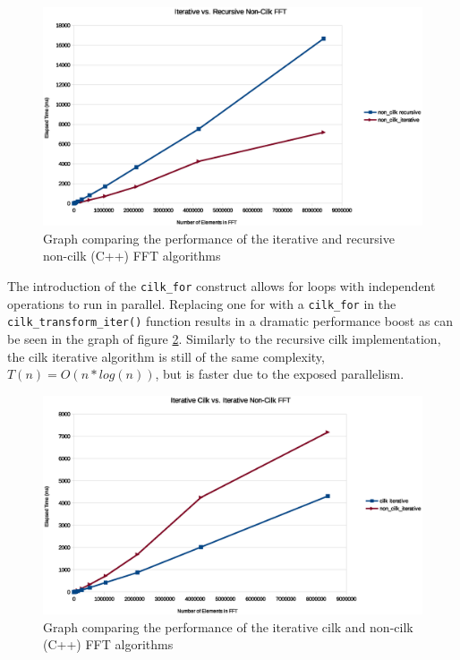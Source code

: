 \begin{figure}
\center
\includegraphics[scale=0.6]{img/iterative_recursive_non_cilk.eps}
\caption{Graph comparing the performance of the iterative and recursive non-cilk (C++) FFT algorithms} 
\label{iterative_recursive_non_cilk}
\end{figure}

The introduction of the \texttt{cilk\_for} construct allows for loops with independent operations to run in parallel. Replacing one for with a \texttt{cilk\_for} in the \texttt{cilk\_transform\_iter()} function results in a dramatic performance boost as can be seen in the graph of figure \ref{iterative_fft}. 
Similarly to the recursive cilk implementation, the cilk iterative algorithm is still of the same complexity, $T(n) = O(n * log(n))$, but is faster due to the exposed parallelism. 

\begin{figure}
\center
\includegraphics[scale=0.6]{img/iterative_fft.eps}
\caption{Graph comparing the performance of the iterative cilk and non-cilk (C++) FFT algorithms} 
\label{iterative_fft}
\end{figure}

